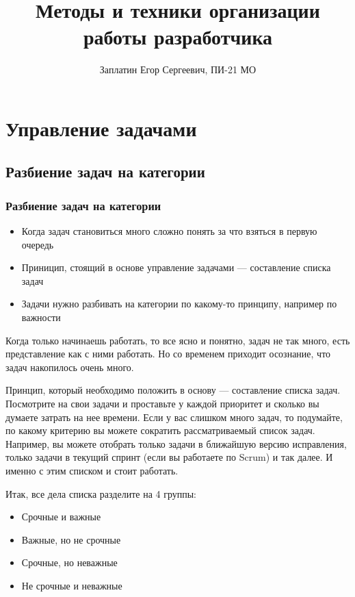\documentclass{../industrial-development}
\title{Методы и техники организации работы разработчика}
\author{Заплатин Егор Сергеевич, ПИ-21 МО}
\date{}
\begin{document}
\begin{frame}
  \titlepage
\end{frame}

\section{Управление задачами}

\subsection{Разбиение задач на категории}

\begin{frame} \frametitle{Разбиение задач на категории}

  \begin{itemize}
  \item Когда задач становиться много сложно понять за что взяться в первую очередь
  \item Приницип, стоящий в основе управление задачами --- составление списка задач
  \item Задачи нужно разбивать на категории по какому-то принципу, например по важности
  \end{itemize}
\end{frame}

\lecturenotes

Когда только начинаешь работать, то все ясно и понятно, задач не так много, есть представление как с ними работать. Но со временем приходит осознание, что задач накопилось очень много.

Принцип, который необходимо положить в основу — составление списка задач. Посмотрите на свои задачи и проставьте у каждой приоритет и сколько вы думаете затрать на нее времени. Если у вас слишком много задач, то подумайте, по какому критерию вы можете сократить рассматриваемый список задач. Например, вы можете отобрать только задачи в ближайшую версию исправления, только задачи в текущий спринт (если вы работаете по Scrum) и так далее. И именно с этим списком и стоит работать.

Итак, все дела списка разделите на 4 группы:
\begin{itemize}
\item Срочные и важные
\item Важные, но не срочные
\item Срочные, но неважные
\item Не срочные и неважные~\cite{TMHabr}
\end{itemize}
\end{document}
